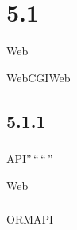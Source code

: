 \hypertarget{section-10}{%
\section{5.1}\label{section-10}}

Web

WebCGIWeb

\important{}\important{}\important{}

\hypertarget{section-11}{%
\subsection{5.1.1}\label{section-11}}

\hypertarget{section-12}{%
\subsubsection{}\label{section-12}}

API''\,``\,``\,''

\important{}\important{}\important{}Web\important{}

\important{}\important{}\important{}

\hypertarget{section-13}{%
\subsubsection{}\label{section-13}}


ORMAPI

